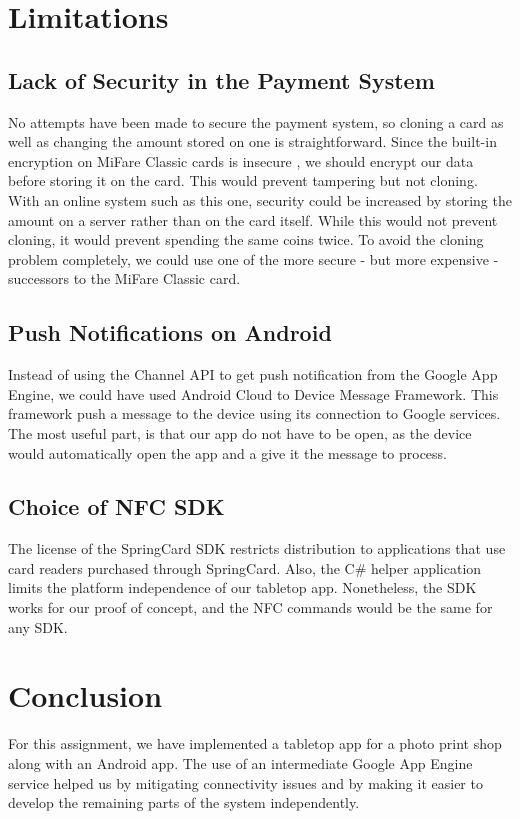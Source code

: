 \documentclass{ubicomp2011}
\begin{document}
\section{Limitations}

\subsection{Lack of Security in the Payment System}
No attempts have been made to secure the payment system, so cloning a card as well as changing the amount stored on one is straightforward. Since the built-in encryption on MiFare Classic cards is insecure \cite{darkSide}, we should encrypt our data before storing it on the card. This would prevent tampering but not cloning. With an online system such as this one, security could be increased by storing the amount on a server rather than on the card itself. While this would not prevent cloning, it would prevent spending the same coins twice. To avoid the cloning problem completely, we could use one of the more secure - but more expensive - successors to the MiFare Classic card.

\subsection{Push Notifications on Android}
Instead of using the Channel API to get push notification from the Google App Engine, we could have used Android Cloud to Device Message Framework. This framework push a message to the device using its connection to Google services. The most useful part, is that our app do not have to be open, as the device would automatically open the app and a give it the message to process.

\subsection{Choice of NFC SDK}
The license of the SpringCard SDK restricts distribution to applications that use card readers purchased through SpringCard. Also, the C\# helper application limits the platform independence of our tabletop app. Nonetheless, the SDK works for our proof of concept, and the NFC commands would be the same for any SDK.

\section{Conclusion}
For this assignment, we have implemented a tabletop app for a photo print shop along with an Android app. The use of an intermediate Google App Engine service helped us by mitigating connectivity issues and by making it easier to develop the remaining parts of the system independently.



\end{document}
